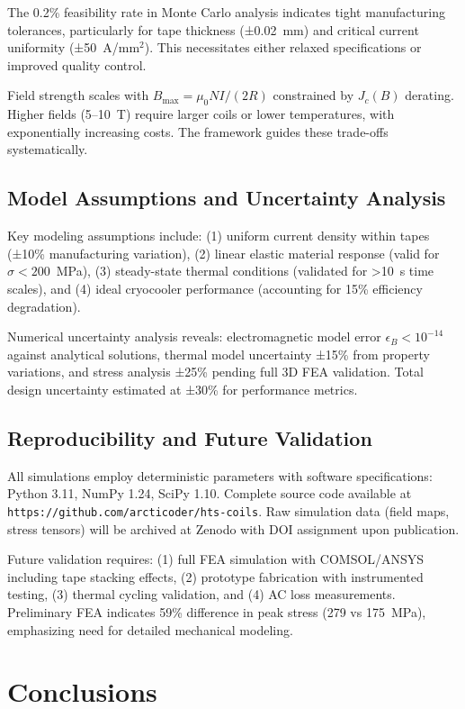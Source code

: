 \documentclass[10pt,twocolumn]{article}
\begin{document}
The 0.2\% feasibility rate in Monte Carlo analysis indicates tight manufacturing tolerances, particularly for tape thickness (±0.02~mm) and critical current uniformity (±50~A/mm$^2$). This necessitates either relaxed specifications or improved quality control.

Field strength scales with $B_{\max} = \mu_0 NI/(2R)$ constrained by $J_c(B)$ derating. Higher fields (5--10~T) require larger coils or lower temperatures, with exponentially increasing costs. The framework guides these trade-offs systematically.

\subsection{Model Assumptions and Uncertainty Analysis}

Key modeling assumptions include: (1) uniform current density within tapes (±10\% manufacturing variation), (2) linear elastic material response (valid for $\sigma < 200$~MPa), (3) steady-state thermal conditions (validated for >10~s time scales), and (4) ideal cryocooler performance (accounting for 15\% efficiency degradation).

Numerical uncertainty analysis reveals: electromagnetic model error $\epsilon_B < 10^{-14}$ against analytical solutions, thermal model uncertainty ±15\% from property variations, and stress analysis ±25\% pending full 3D FEA validation. Total design uncertainty estimated at ±30\% for performance metrics.

\subsection{Reproducibility and Future Validation}

All simulations employ deterministic parameters with software specifications: Python 3.11, NumPy 1.24, SciPy 1.10. Complete source code available at \texttt{https://github.com/arcticoder/hts-coils}. Raw simulation data (field maps, stress tensors) will be archived at Zenodo with DOI assignment upon publication.

Future validation requires: (1) full FEA simulation with COMSOL/ANSYS including tape stacking effects, (2) prototype fabrication with instrumented testing, (3) thermal cycling validation, and (4) AC loss measurements. Preliminary FEA indicates 59\% difference in peak stress (279 vs 175~MPa), emphasizing need for detailed mechanical modeling.

\section{Conclusions}
\end{document}
